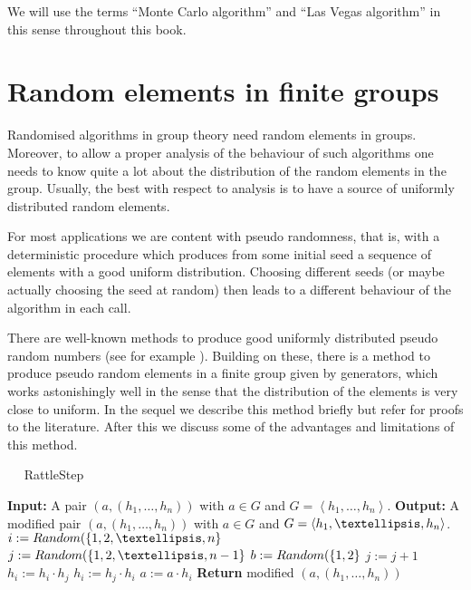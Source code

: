 We will use the terms ``Monte Carlo algorithm'' and ``Las Vegas
algorithm'' in this sense throughout this book.

\section{Random elements in finite groups}
\label{randomelts}

Randomised algorithms in group theory need random elements in groups.
Moreover, to allow a proper analysis of the behaviour of such
algorithms one needs to know quite a lot about the distribution of
the random elements in the group. Usually, the best with respect to
analysis is to have a source of uniformly distributed random elements.

For most applications we are content with pseudo randomness, that is, with a
deterministic procedure which produces from some initial seed a sequence of 
elements with a good uniform distribution. Choosing different seeds (or
maybe actually choosing the seed at random) then leads to a different
behaviour of the algorithm in each call.

There are well-known methods to produce good uniformly distributed
pseudo random numbers (see for example \cite[Chapter~3]{AOCP2}).
Building on these, there is a method to produce pseudo random elements
in a finite group given by generators, which works astonishingly
well in the sense that the distribution of the elements is very close
to uniform. In the sequel we describe this method briefly but refer
for proofs to the literature. After this we discuss some of the
advantages and limitations of this method.

\begin{algorithm}
\caption{$\quad$ \sc RattleStep}
\label{rattlestep}
%
\begin{algorithmic}
\STATE \textbf{Input:} A pair $(a,(h_1, \ldots, h_n))$ with $a \in G$
and $G = \left< h_1, \ldots, h_n \right>$.
\STATE \textbf{Output:} A modified pair $(a,(h_1, \ldots, h_n))$ with $a \in G$
and $G = \left< \smash{h_1, \ldots, h_n} \right>$.
\vspace*{2mm}
\STATE $i := \textsc{Random}(\{ 1,2,\ldots,n\}$
\STATE $j := \textsc{Random}(\{1,2,\ldots,n-1\}$
\STATE $b := \textsc{Random}(\{1,2\}$
    \STATE $j := j + 1$
\ENDIF
{}
    \STATE $h_i := h_i \cdot h_j$
\ELSE
    \STATE $h_i := h_j \cdot h_i$
\ENDIF
\STATE $a := a \cdot h_i$
\STATE \textbf{Return} modified $(a,(h_1,\ldots,h_n))$
\end{algorithmic}
\end{algorithm}

